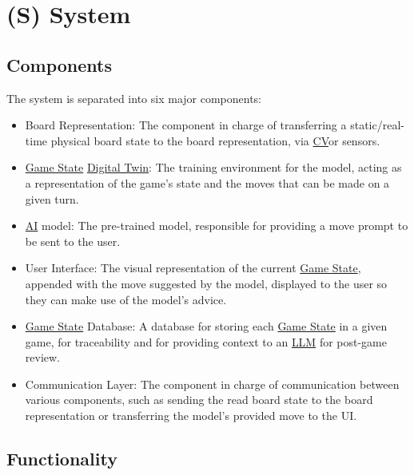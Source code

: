 \documentclass{article}
\newcommand{\AI}{\href{https://en.wikipedia.org/wiki/Artificial_intelligence}{AI}}
\newcommand{\DigitalTwin}{\href{https://en.wikipedia.org/wiki/Digital_twin}{Digital Twin}}
\newcommand{\CV}{\href{https://www.ibm.com/think/topics/computer-vision}{CV}}
\newcommand{\LLM}{\href{https://www.cloudflare.com/learning/ai/what-is-large-language-model/}{LLM}}
\newcommand{\GameState}{\href{https://milvus.io/ai-quick-reference/what-is-a-state-in-rl}{Game State}}
\begin{document}
    
\newpage{}




\section*{(S) System}\label{sec:srs-system}
\renewcommand{\thesubsection}{S.\arabic{subsection}}
\setcounter{subsection}{0}

\subsection{Components}\label{subsec:components}
The system is separated into six major components:

\begin{itemize}
    \item Board Representation: The component
    in charge of transferring a static/real-time physical board state to the board
    representation, via \CV{}or sensors.

    \item \GameState{} \DigitalTwin{}: The training
    environment for the model, acting as a representation of the game's state and the
    moves that can be made on a given turn.

    \item \AI{} model: The pre-trained model,
    responsible for providing a move prompt to be sent to the user.

    \item User Interface: The visual
    representation of the current \GameState{}, appended with the move suggested by
    the model, displayed to the user so they can make use of the model's advice.

    \item \GameState{} Database: A database for
    storing each \GameState{} in a given game, for traceability and for providing
    context to an \LLM{} for post-game review.

    \item Communication Layer: The component
    in charge of communication between various components, such as sending the read
    board state to the board representation or transferring the model’s provided
    move to the UI\@.
\end{itemize}


\subsection{Functionality}\label{subsec:functionality}
\end{document}
